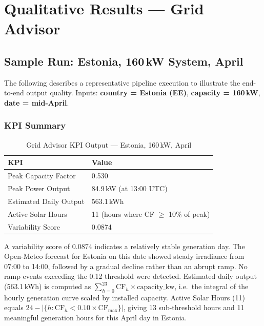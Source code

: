 \documentclass[12pt, a4paper]{article}
\begin{document}
\newpage
\section{Qualitative Results --- Grid Advisor}
\label{sec:qualitative}

\subsection{Sample Run: Estonia, 160\,kW System, April}

The following describes a representative pipeline execution to illustrate the end-to-end output quality. Inputs: \textbf{country = Estonia (EE)}, \textbf{capacity = 160\,kW}, \textbf{date = mid-April}.

\subsubsection{KPI Summary}

\begin{table}[H]
    \centering
    \caption{Grid Advisor KPI Output --- Estonia, 160\,kW, April}
    \begin{tabular}{ll}
        \toprule
        \textbf{KPI} & \textbf{Value} \\
        \midrule
        Peak Capacity Factor & 0.530 \\
        Peak Power Output & 84.9\,kW (at 13:00 UTC) \\
        Estimated Daily Output & 563.1\,kWh \\
        Active Solar Hours & 11 (hours where CF $\geq$ 10\% of peak) \\
        Variability Score & 0.0874 \\
        \bottomrule
    \end{tabular}
\end{table}

A variability score of 0.0874 indicates a relatively stable generation day. The Open-Meteo forecast for Estonia on this date showed steady irradiance from 07:00 to 14:00, followed by a gradual decline rather than an abrupt ramp. No ramp events exceeding the 0.12 threshold were detected. Estimated daily output (563.1\,kWh) is computed as $\sum_{h=0}^{23} \text{CF}_h \times \text{capacity\_kw}$, i.e.\ the integral of the hourly generation curve scaled by installed capacity. Active Solar Hours (11) equals $24 - |\{h : \text{CF}_h < 0.10 \times \text{CF}_{\max}\}|$, giving 13 sub-threshold hours and 11 meaningful generation hours for this April day in Estonia.
\end{document}
